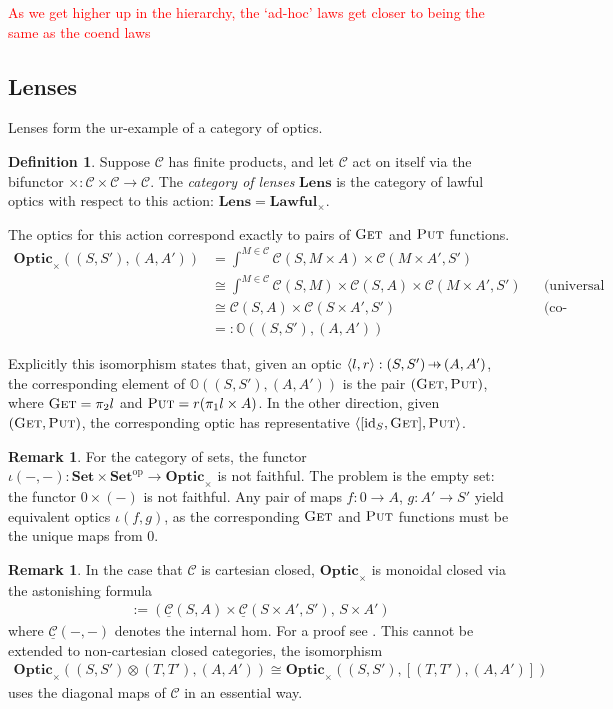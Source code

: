 \documentclass[11pt,a4paper]{article}
\theoremstyle{plain}
\theoremstyle{definition}
\newtheorem{definition}[theorem]{Definition}
\newtheorem{remark}[theorem]{Remark}
\newcommand{\C}{\mathscr{C}}
\newcommand{\homC}{\underline{\C}}
\newcommand{\Set}{\mathbf{Set}}
\newcommand{\Optic}{\mathbf{Optic}}
\newcommand{\Lawful}{\mathbf{Lawful}}
\newcommand{\Lens}{\mathbf{Lens}}
\newcommand{\id}{\mathrm{id}}
\newcommand{\op}{\mathrm{op}}
\newcommand{\fget}{\textsc{Get}}
\newcommand{\fput}{\textsc{Put}}
\newcommand{\hto}{\ensuremath{\,\mathaccent\shortmid\rightarrow\,}}
\newcommand{\todo}[1]{\textcolor{red}{\small #1}}
\begin{document}
\todo{As we get higher up in the hierarchy, the `ad-hoc' laws get closer to being the same as the coend laws}

\subsection{Lenses}

Lenses form the ur-example of a category of optics.

\begin{definition}
Suppose $\C$ has finite products, and let $\C$ act on itself via the bifunctor $\times : \C \times \C \to \C$. The \emph{category of lenses} $\Lens$ is the category of lawful optics with respect to this action: $\Lens = \Lawful_\times$.
\end{definition}

The optics for this action correspond exactly to pairs of $\fget$ and $\fput$ functions.
\begin{align*}
\Optic_\times((S, S'), (A, A')) &= \int^{M \in \C} \C(S, M \times A) \times \C(M \times A', S') \\
&\cong \int^{M \in \C} \C(S, M) \times \C(S, A) \times \C(M \times A', S') && \text{(universal property of product)} \\
&\cong \C(S, A) \times \C(S \times A', S') && \text{(co-Yoneda)} \\
&=: \mathbb{O}((S, S'), (A, A'))
\end{align*}

Explicitly this isomorphism states that, given an optic $\langle l, r \rangle : (S, S') \hto (A, A')$, the corresponding element of $\mathbb{O}((S, S'), (A, A'))$ is the pair $(\fget, \fput)$, where $\fget = \pi_2 l$ and $\fput = r (\pi_1 l \times A)$. In the other direction, given $(\fget, \fput)$, the corresponding optic has representative $\langle [\id_S, \fget],  \fput \rangle$.

\begin{remark} \label{lens-iota-not-faithful}
For the category of sets, the functor $\iota(-, -) : \Set \times \Set^\op \to \Optic_\times$ is not faithful. The problem is the empty set: the functor $0 \times (-)$ is not faithful. Any pair of maps $f : 0 \to A$, $g : A' \to S'$ yield equivalent optics $\iota(f, g)$, as the corresponding $\fget$ and $\fput$ functions must be the unique maps from $0$.
\end{remark}

\begin{remark}
In the case that $\C$ is cartesian closed, $\Optic_\times$ is monoidal closed via the astonishing formula
\begin{align*}
[(S, S'), (A, A')] := (\homC(S, A) \times \homC(S \times A', S'), \, S \times A')
\end{align*}
where $\homC(-, -)$ denotes the internal hom. For a proof see \cite[Section 1.2]{DialecticaCategories}. This cannot be extended to non-cartesian closed categories, the isomorphism 
\begin{align*}
\Optic_\times((S, S') \otimes (T, T'), (A, A')) \cong \Optic_\times((S, S'),  [(T, T'), (A, A')])
\end{align*}
uses the diagonal maps of $\C$ in an essential way.
\end{remark}
\end{document}
